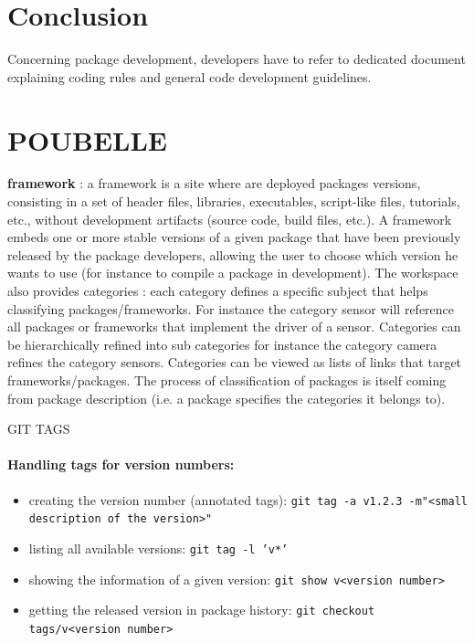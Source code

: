 \documentclass[12pt,a4paper]{article}
\begin{document}
\section*{Conclusion}

Concerning package development, developers have to refer to dedicated document explaining coding rules and general code development guidelines.

\section*{POUBELLE}

\textbf{framework} :  a framework is a site where are deployed packages versions, consisting in a set of header files, libraries, executables, script-like files, tutorials, etc., without development artifacts (source code, build files, etc.). A framework embeds one or more stable versions of a given package that have been previously released by the package developers, allowing the user to choose which version he wants to use (for instance to compile a package in development).
 The workspace also provides categories : each category defines a specific subject that helps classifying packages/frameworks. For instance the category sensor will reference all packages or frameworks that implement the driver of a sensor. Categories can be hierarchically refined into sub categories for instance the category camera refines the category sensors. Categories can be viewed as lists of links that target frameworks/packages. The process of classification of packages is itself coming from package description (i.e. a package specifies the categories it belongs to).
 
 
GIT TAGS
 
\paragraph{Handling tags for version numbers:}
\begin{itemize}
\item creating the version number (annotated tags):
\linebreak \texttt{git tag -a v1.2.3 -m"<small description of the version>"}
\item listing all available versions: 
\linebreak \texttt{git tag -l 'v*'}
\item showing the information of a given version: 
\linebreak \texttt{git show v<version number>}
\item getting the released version in package history: 
\linebreak \texttt{git checkout tags/v<version number>}
\end{itemize}
\end{document}
